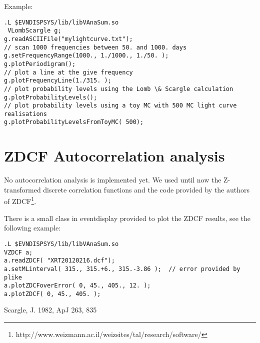 \documentclass[titlepage,a4paper,twoside,11pt]{report}
\begin{document}
Example:

\begin{lstlisting}
.L $EVNDISPSYS/lib/libVAnaSum.so 
 VLombScargle g;
g.readASCIIFile("mylightcurve.txt");
// scan 1000 frequencies between 50. and 1000. days
g.setFrequencyRange(1000., 1./1000., 1./50. );
g.plotPeriodigram();
// plot a line at the give frequency
g.plotFrequencyLine(1./315. );
// plot probability levels using the Lomb \& Scargle calculation
g.plotProbabilityLevels();
// plot probability levels using a toy MC with 500 MC light curve realisations
g.plotProbabilityLevelsFromToyMC( 500);
\end{lstlisting}

\section{ZDCF Autocorrelation analysis}

No autocorrelation analysis is implemented yet. We used until now the Z-transformed discrete correlation functions and the code provided by the authors of ZDCF\footnote{http://www.weizmann.ac.il/weizsites/tal/research/software/}.

There is a small class in eventdisplay provided to plot the ZDCF results, see the following example:

\begin{lstlisting}
.L $EVNDISPSYS/lib/libVAnaSum.so 
VZDCF a;
a.readZDCF( "XRT20120216.dcf");
a.setMLinterval( 315., 315.+6., 315.-3.86 );  // error provided by plike
a.plotZDCFoverError( 0, 45., 405., 12. );
a.plotZDCF( 0, 45., 405. );
\end{lstlisting}






%
%
%


\begin{thebibliography}{}
 Scargle, J. 1982, ApJ 263, 835
\end{thebibliography}
\end{document}
